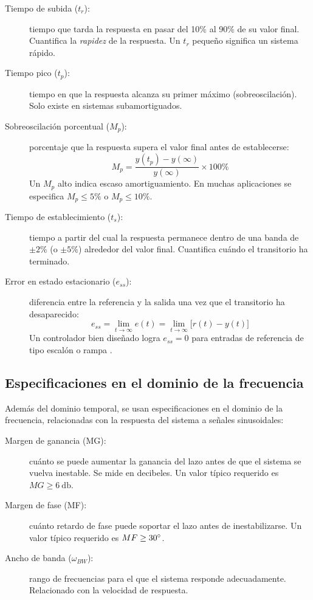 \begin{description}
  \item[Tiempo de subida ($t_r$):] tiempo que tarda la respuesta en pasar
    del 10\% al 90\% de su valor final. Cuantifica la \textit{rapidez} de
    la respuesta. Un $t_r$ pequeño significa un sistema rápido.
  \item[Tiempo pico ($t_p$):] tiempo en que la respuesta alcanza su primer
    máximo (sobreoscilación). Solo existe en sistemas subamortiguados.
  \item[Sobreoscilación porcentual ($M_p$):] porcentaje que la respuesta
    supera el valor final antes de establecerse:
    \begin{equation}
      M_p = \frac{y(t_p) - y(\infty)}{y(\infty)} \times 100\%
    \end{equation}
    Un $M_p$ alto indica escaso amortiguamiento. En muchas aplicaciones
    se especifica $M_p \leq 5\%$ o $M_p \leq 10\%$.
  \item[Tiempo de establecimiento ($t_s$):] tiempo a partir del cual la
    respuesta permanece dentro de una banda de $\pm 2\%$ (o $\pm 5\%$)
    alrededor del valor final. Cuantifica cuándo el transitorio ha terminado.
  \item[Error en estado estacionario ($e_{ss}$):] diferencia entre la
    referencia y la salida una vez que el transitorio ha desaparecido:
    \begin{equation}
      e_{ss} = \lim_{t\to\infty} e(t) = \lim_{t\to\infty} \bigl[r(t) - y(t)\bigr]
    \end{equation}
    Un controlador bien diseñado logra $e_{ss} = 0$ para entradas de
    referencia de tipo escalón o rampa .
\end{description}

\subsection{Especificaciones en el dominio de la frecuencia}

Además del dominio temporal, se usan especificaciones en el dominio de la
frecuencia, relacionadas con la respuesta del sistema a señales sinusoidales:

\begin{description}
  \item[Margen de ganancia (MG):] cuánto se puede aumentar la ganancia
    del lazo antes de que el sistema se vuelva inestable. Se mide en decibeles.
    Un valor típico requerido es $MG \geq \SI{6}{\decibel}$.
  \item[Margen de fase (MF):] cuánto retardo de fase puede soportar el lazo
    antes de inestabilizarse. Un valor típico requerido es $MF \geq 30^{\circ}$.
  \item[Ancho de banda ($\omega_{BW}$):] rango de frecuencias para el que
    el sistema responde adecuadamente. Relacionado con la velocidad de respuesta.
\end{description}

